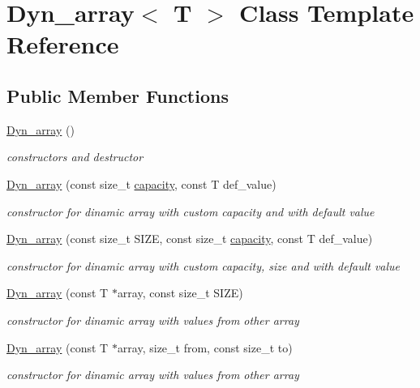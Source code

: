 \hypertarget{classDyn__array}{}\section{Dyn\+\_\+array$<$ T $>$ Class Template Reference}
\label{classDyn__array}
\subsection*{Public Member Functions}
\begin{DoxyCompactItemize}
\item 
\hyperlink{classDyn__array_a3afc99260021fc0a0861c7a6dffa7dcb}{Dyn\+\_\+array} ()
\begin{DoxyCompactList}\small\item\em constructors and destructor \end{DoxyCompactList}\item 
\hyperlink{classDyn__array_a25117136ea5c69b0bee57d5c12b481b9}{Dyn\+\_\+array} (const size\+\_\+t \hyperlink{classDyn__array_a36c5289ec13ee40366fe3b095b2347bf}{capacity}, const T def\+\_\+value)
\begin{DoxyCompactList}\small\item\em constructor for dinamic array with custom capacity and with default value \end{DoxyCompactList}\item 
\hyperlink{classDyn__array_ab65231e8b87c5fbb58f22fb8a1d18ee3}{Dyn\+\_\+array} (const size\+\_\+t S\+I\+ZE, const size\+\_\+t \hyperlink{classDyn__array_a36c5289ec13ee40366fe3b095b2347bf}{capacity}, const T def\+\_\+value)
\begin{DoxyCompactList}\small\item\em constructor for dinamic array with custom capacity, size and with default value \end{DoxyCompactList}\item 
\hyperlink{classDyn__array_a732dc944171bd9abbf0086af367e3202}{Dyn\+\_\+array} (const T $\ast$array, const size\+\_\+t S\+I\+ZE)
\begin{DoxyCompactList}\small\item\em constructor for dinamic array with values from other array \end{DoxyCompactList}\item 
\hyperlink{classDyn__array_a7fa28275bd20add3643eeab60e06a431}{Dyn\+\_\+array} (const T $\ast$array, size\+\_\+t from, const size\+\_\+t to)
\begin{DoxyCompactList}\small\item\em constructor for dinamic array with values from other array \end{DoxyCompactList}\item 

\end{DoxyCompactItemize}
